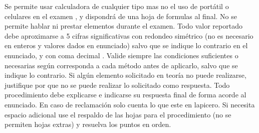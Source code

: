 \documentclass[12pt]{article}
\begin{document}
{\scriptsize  
Se permite usar calculadora de cualquier tipo mas no el uso de portátil o celulares en el examen%
, y dispondrá de una hoja de formulas al final. %
No se permite hablar ni prestar elementos durante el examen. %
Todo valor reportado debe aproximarse a 5 cifras significativas con redondeo simétrico (no es necesario en enteros y valores dados en enunciado) salvo que se indique lo contrario en el enunciado, y con coma decimal%
. 
Valide siempre las condiciones suficientes o necesarias según corresponda a cada método antes de aplicarlo, salvo que se indique lo contrario. Si algún elemento solicitado en teoría no puede realizarse, justifique por que no se puede realizar lo solicitado como respuesta. Todo procedimiento debe explicarse e indicarse su respuesta final de forma acorde al enunciado. %
En caso de reclamación solo cuenta lo que este en lapicero. %
Si necesita espacio adicional %
use el respaldo de las hojas para el procedimiento (no se permiten hojas extras) y resuelva los puntos en orden. %

}

\end{document}
